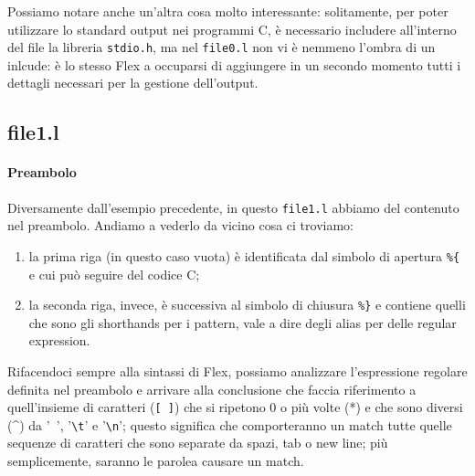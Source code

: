 \documentclass[class=book, crop=false, oneside, 12pt]{standalone}
\begin{document}
Possiamo notare anche un'altra cosa molto interessante: solitamente, per poter utilizzare lo standard output nei programmi C, è necessario includere all'interno del file la libreria \texttt{stdio.h}, ma nel \texttt{file0.l} non vi è nemmeno l'ombra di un inlcude: è lo stesso Flex a occuparsi di aggiungere in un secondo momento tutti i dettagli necessari per la gestione dell'output.

\subsection*{file1.l}


\paragraph{Preambolo}
Diversamente dall'esempio precedente, in questo \texttt{file1.l} abbiamo del contenuto nel preambolo. Andiamo a vederlo da vicino cosa ci troviamo:

\begin{enumerate}
    \item la prima riga (in questo caso vuota) è identificata dal simbolo di apertura \texttt{\%\{} e cui può seguire del codice C;
    \item la seconda riga, invece, è successiva al simbolo di chiusura \texttt{\%\}} e contiene quelli che sono gli shorthands per i pattern, vale a dire degli alias per delle regular expression.
\end{enumerate}

Rifacendoci sempre alla sintassi di Flex, possiamo analizzare l'espressione regolare definita nel preambolo e arrivare alla conclusione che faccia riferimento a quell'insieme di caratteri (\texttt{[ ]}) che si ripetono \(0\) o più volte (*) e che sono diversi (\^{}) da '\texttt{ }', '\texttt{\textbackslash t}' e '\texttt{\textbackslash n}'; questo significa che comporteranno un match tutte quelle sequenze di caratteri che sono separate da spazi, tab o new line; più semplicemente, saranno le parolea causare un match.
\end{document}
